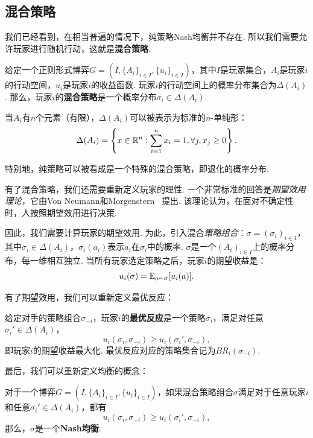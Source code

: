 \subsection{混合策略}\label{sec:mixed-strategy}
我们已经看到，在相当普遍的情况下，纯策略Nash均衡并不存在. 所以我们需要允许玩家进行随机行动，这就是\textbf{混合策略}. 

\begin{definition}[混合策略]
给定一个正则形式博弈$G=(I,\{A_i\}_{i\in I},\{u_i\}_{i\in I})$，其中$I$是玩家集合，$A_i$是玩家$i$的行动空间，$u_i$是玩家$i$的收益函数. 玩家$i$的行动空间上的概率分布集合为$\Delta(A_i)$. 那么，玩家$i$的\textbf{混合策略}是一个概率分布$\sigma_i\in\Delta(A_i)$. 
\end{definition}

当$A_i$有$n$个元素（有限），$\Delta(A_i)$可以被表示为标准的$n$-单纯形：
    \[\Delta(A_i)=\left\{x\in\mathbb{R}^n:\sum_{i=1}^n x_i=1,\forall j,x_j\geq 0\right\}.\]

特别地，纯策略可以被看成是一个特殊的混合策略，即退化的概率分布.

有了混合策略，我们还需要重新定义玩家的理性. 一个非常标准的回答是\textit{期望效用理论}，它由Von Neumann和Morgenstern~\cite{vonneumannTheoryGamesEconomic2007} 提出. 该理论认为，在面对不确定性时，人按照期望效用进行决策. 

因此，我们需要计算玩家的期望效用. 为此，引入混合\textit{策略组合}：$\sigma=(\sigma_i)_{i\in I}$，其中$\sigma_i\in\Delta(A_i)$，$\sigma_i(a_i)$表示$a_i$在$\sigma_i$中的概率. $\sigma$是一个$(A_i)_{i\in I}$上的概率分布，每一维相互独立. 当所有玩家选定策略之后，玩家$i$的期望收益是：
    \[u_i(\sigma)=\mathbb{E}_{a\sim\sigma}[u_i(a)].\]

有了期望效用，我们可以重新定义最优反应：

\begin{definition}[最优反应]
给定对手的策略组合$\sigma_{-i}$，玩家$i$的\textbf{最优反应}是一个策略$\sigma_i$，满足对任意$\sigma_i'\in \Delta(A_i)$，
    \[u_i(\sigma_i,\sigma_{-i})\geq u_i(\sigma_i',\sigma_{-i}),\]
即玩家$i$的期望收益最大化. 最优反应对应的策略集合记为$BR_i(\sigma_{-i})$.
\end{definition}

最后，我们可以重新定义均衡的概念：

\begin{definition}[Nash均衡]
对于一个博弈$G=(I,\{A_i\}_{i\in I},\{u_i\}_{i\in I})$，如果混合策略组合$\sigma$满足对于任意玩家$i$和任意$\sigma_i'\in \Delta(A_i)$，都有
\[u_i(\sigma_i,\sigma_{-i})\geq u_i(\sigma_i',\sigma_{-i}),\]
那么，$\sigma$是一个\textbf{Nash均衡}.
\end{definition}

